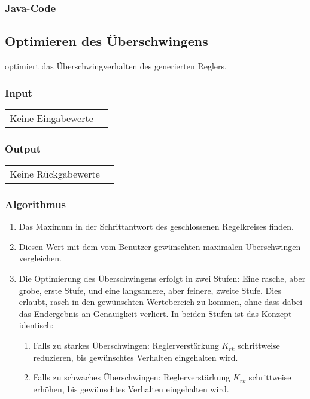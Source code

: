 \subsubsection*{Java-Code}



\clearpage
\subsection{Optimieren des \"Uberschwingens}
\label{app:algo:oversh}

   optimiert   das  \"Uberschwingverhalten   des
generierten Reglers.

\subsubsection*{Input}

\begin{tabular}{p{40mm}l}
    Keine Eingabewerte &
\end{tabular}

\subsubsection*{Output}
\begin{tabular}{p{40mm}l}
    Keine R\"uckgabewerte &
\end{tabular}

\subsubsection*{Algorithmus}
\begin{enumerate}
    \item
        Das Maximum in der Schrittantwort des geschlossenen Regelkreises finden.
    \item
        Diesen Wert mit dem vom Benutzer gew\"unschten maximalen \"Uberschwingen vergleichen.
    \item
        Die  Optimierung des  \"Uberschwingens  erfolgt  in zwei  Stufen: Eine
        rasche, aber  grobe, erste Stufe,  und eine langsamere,  aber feinere,
        zweite Stufe.   Dies erlaubt, rasch in  den gew\"unschten Wertebereich
        zu kommen, ohne dass dabei das Endergebnis an Genauigkeit verliert. In
        beiden Stufen ist das Konzept identisch:
    \begin{enumerate}
        \item
            Falls  zu  starkes  \"Uberschwingen: Reglerverst\"arkung  $K_{rk}$
            schrittweise reduzieren,  bis gew\"unschtes  Verhalten eingehalten
            wird.
        \item
            Falls  zu schwaches  \"Uberschwingen: Reglerverst\"arkung $K_{rk}$
            schrittweise  erh\"ohen, bis  gew\"unschtes Verhalten  eingehalten
            wird.
    \end{enumerate}
\end{enumerate}

